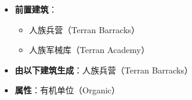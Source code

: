 \begin{tcolorbox}[colback=white, colframe=black!60!white, title=Terran\_Siege\_Tank\_Siege\_Mode(), arc=0mm]
    \begin{itemize}
    \item \textbf{前置建筑}：
        \begin{itemize}
            \item 人族兵营（Terran Barracks）
            \item 人族军械库（Terran Academy）
        \end{itemize}
    \item \textbf{由以下建筑生成}：人族兵营（Terran Barracks）
    \item \textbf{属性}：有机单位（Organic）
\end{itemize}
\end{tcolorbox}

